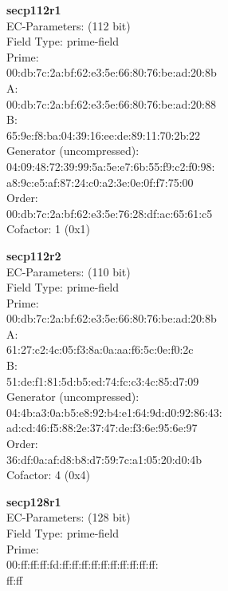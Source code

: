 \item \textbf{ secp112r1 }\\
EC-Parameters: (112 bit)\\
Field Type: prime-field\\
Prime:\\
    00:db:7c:2a:bf:62:e3:5e:66:80:76:be:ad:20:8b\\
A:   \\
    00:db:7c:2a:bf:62:e3:5e:66:80:76:be:ad:20:88\\
B:   \\
    65:9e:f8:ba:04:39:16:ee:de:89:11:70:2b:22\\
Generator (uncompressed):\\
    04:09:48:72:39:99:5a:5e:e7:6b:55:f9:c2:f0:98:\\
    a8:9c:e5:af:87:24:c0:a2:3e:0e:0f:f7:75:00\\
Order: \\
    00:db:7c:2a:bf:62:e3:5e:76:28:df:ac:65:61:c5\\
Cofactor:  1 (0x1)\\
\item \textbf{ secp112r2 }\\
EC-Parameters: (110 bit)\\
Field Type: prime-field\\
Prime:\\
    00:db:7c:2a:bf:62:e3:5e:66:80:76:be:ad:20:8b\\
A:   \\
    61:27:c2:4c:05:f3:8a:0a:aa:f6:5c:0e:f0:2c\\
B:   \\
    51:de:f1:81:5d:b5:ed:74:fc:c3:4c:85:d7:09\\
Generator (uncompressed):\\
    04:4b:a3:0a:b5:e8:92:b4:e1:64:9d:d0:92:86:43:\\
    ad:cd:46:f5:88:2e:37:47:de:f3:6e:95:6e:97\\
Order: \\
    36:df:0a:af:d8:b8:d7:59:7c:a1:05:20:d0:4b\\
Cofactor:  4 (0x4)\\
\item \textbf{ secp128r1 }\\
EC-Parameters: (128 bit)\\
Field Type: prime-field\\
Prime:\\
    00:ff:ff:ff:fd:ff:ff:ff:ff:ff:ff:ff:ff:ff:ff:\\
    ff:ff\\
